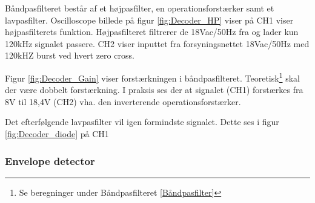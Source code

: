 Båndpasfilteret består af et højpasfilter, en operationsforstærker samt et lavpasfilter. 
Oscilloscope billede på figur \ref{fig:Decoder_HP} viser på CH1 viser højpasfilterets funktion. Højpasfilteret filtrerer de 18Vac/50Hz fra og lader kun 120kHz signalet passere. CH2 viser inputtet fra forsyningsnettet 18Vac/50Hz med 120kHZ burst ved hvert zero cross.

Figur \ref{fig:Decoder_Gain} viser forstærkningen i båndpasfilteret. Teoretisk\footnote{Se beregninger under Båndpasfilteret \ref{Båndpasfilter}} skal der være dobbelt forstærkning. I praksis ses der at signalet (CH1) forstærkes fra 8V til 18,4V (CH2) vha. den inverterende operationsforstærker.

Det efterfølgende lavpasfilter vil igen formindste signalet. Dette ses i figur \ref{fig:Decoder_diode} på CH1 


\subsubsection{Envelope detector}

